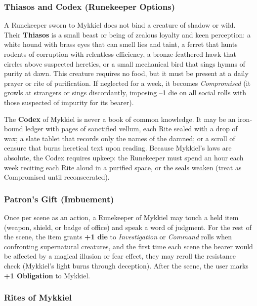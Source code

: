 \subsubsection*{Thiasos and Codex (Runekeeper Options)}

A Runekeeper sworn to Mykkiel does not bind a creature of shadow or wild. Their \textbf{Thiasos} is a small beast or being of zealous loyalty and keen perception: a white hound with brass eyes that can smell lies and taint, a ferret that hunts rodents of corruption with relentless efficiency, a bronze-feathered hawk that circles above suspected heretics, or a small mechanical bird that sings hymns of purity at dawn. This creature requires no food, but it must be present at a daily prayer or rite of purification. If neglected for a week, it becomes \textit{Compromised} (it growls at strangers or sings discordantly, imposing --1 die on all social rolls with those suspected of impurity for its bearer).

The \textbf{Codex} of Mykkiel is never a book of common knowledge. It may be an iron-bound ledger with pages of sanctified vellum, each Rite sealed with a drop of wax; a slate tablet that records only the names of the damned; or a scroll of censure that burns heretical text upon reading. Because Mykkiel's laws are absolute, the Codex requires upkeep: the Runekeeper must spend an hour each week reciting each Rite aloud in a purified space, or the seals weaken (treat as Compromised until reconsecrated).

\subsubsection*{Patron's Gift (Imbuement)}

Once per scene as an action, a Runekeeper of Mykkiel may touch a held item (weapon, shield, or badge of office) and speak a word of judgment. For the rest of the scene, the item grants \textbf{+1 die} to \textit{Investigation} or \textit{Command} rolls when confronting supernatural creatures, and the first time each scene the bearer would be affected by a magical illusion or fear effect, they may reroll the resistance check (Mykkiel's light burns through deception). After the scene, the user marks \textbf{+1 Obligation} to Mykkiel.

\subsubsection*{Rites of Mykkiel}

